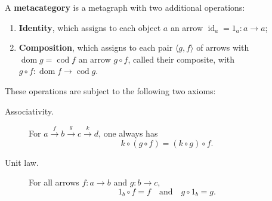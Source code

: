 A \textbf{metacategory} is a metagraph with two additional operations:
\begin{enumerate}
\item \textbf{Identity}, which assigns to each object $a$ an arrow $\operatorname{id}_a = 1_a : a \rightarrow a$;
\item \textbf{Composition}, which assigns to each pair $\langle g, f \rangle$ of arrows with $\operatorname{dom} g = \operatorname{cod} f$ an arrow $g \circ f$, called their composite, with $g \circ f : \operatorname{dom} f \rightarrow \operatorname{cod} g$.
\end{enumerate}
These operations are subject to the following two axioms:
\begin{description}
\item[Associativity.] For $a \xrightarrow{f} b \xrightarrow{g} c \xrightarrow{k} d$, one always has
$$k \circ (g \circ f) = (k \circ g) \circ f.$$
\item[Unit law.] For all arrows $f: a \rightarrow b$ and $g: b \rightarrow c$,
$$1_b \circ f = f \quad \text{and} \quad g \circ 1_b = g.$$
\end{description}
